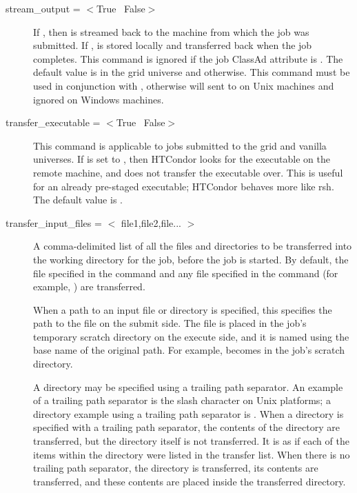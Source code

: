 \begin{description}
\label{man-condor-submit-stream-output}
\item[stream\_output = $<$True \Bar\ False$>$]
If , then  is streamed back to
the machine from which the job was submitted.
If ,  is stored locally
and transferred back when the job completes.
This command is ignored if the job ClassAd attribute
 is
.
The default value is  in the grid
universe and  otherwise.
This command must be used in conjunction with 
, otherwise  will
sent to  on Unix machines and
ignored on Windows machines.


\label{man-condor-submit-transfer-executable}
\item[transfer\_executable = $<$True \Bar\ False$>$]
This command is applicable to jobs submitted to the grid
and vanilla universes.
If  is set to
, then HTCondor looks for the executable on the remote machine, and
does not transfer the executable over.
This is useful for an already pre-staged 
executable; HTCondor behaves more like rsh.
The default value is .


\item[transfer\_input\_files = $<$ file1,file2,file... $>$]
\label{man-condor-submit-transfer-input-files}
A comma-delimited list of all the files and directories to be transferred
into the working directory for the job, before the job is started.
By default, the file specified in the
 command and any file specified in the 
command (for example, ) are transferred.

When a path to an input file or directory is specified, this specifies
the path to the file on the submit side.
The file is placed in the job's temporary scratch directory on the execute side,
and it is named using the base name of the original path.  For
example,  becomes  in the job's
scratch directory.

A directory may be specified using a trailing path separator.
An example of a trailing path separator is the slash character on Unix
platforms; a directory example using a trailing path separator
is . 
When a directory is specified with a trailing path separator,
the contents of the directory are
transferred,  but the directory itself is not transferred.
It is as if each of the items
within the directory were listed in the transfer list.
When there is no trailing path separator,
the directory is transferred, its contents are transferred,
and these contents are placed inside the transferred directory.


\end{description}
